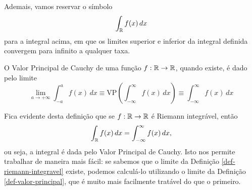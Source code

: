         Ademais, vamos reservar o símbolo
        \begin{equation*}
            \int_{\mathbb{R}} f(x) \, dx
        \end{equation*}
        para a integral acima, em que os limites superior e inferior da integral definida
        convergem para infinito a qualquer taxa.
        \begin{definicao}
        \label{def-valor-principal}
            O Valor Principal de Cauchy de uma função $f:\mathbb{R}\to\mathbb{R}$, quando existe, é dado pelo limite
            \begin{equation*}
                \lim_{a\to +\infty} \int_{-a}^a f(x) \, dx 
                \equiv \text{VP}\left( \int_{-\infty}^{\infty} f(x) \, dx \right)
                \equiv \int_{-\infty}^{\infty} f(x) \, dx
            \end{equation*}
        \end{definicao}
        Fica evidente desta definição que se $f:\mathbb{R}\to\mathbb{R}$ é Riemann integrável, então
        \begin{equation*}
            \int_{\mathbb{R}} f(x) \, dx = \int_{-\infty}^{\infty} f(x) \, dx,
        \end{equation*}
        ou seja, a integral é dada pelo Valor Principal de Cauchy. Isto nos permite trabalhar de
        maneira mais fácil: se sabemos que o limite da Definição \ref{def-riemann-integravel} 
        existe, podemos calculá-lo utilizando o limite da Definição \ref{def-valor-principal}, 
        que é muito mais facilmente tratável do que o primeiro.
        
